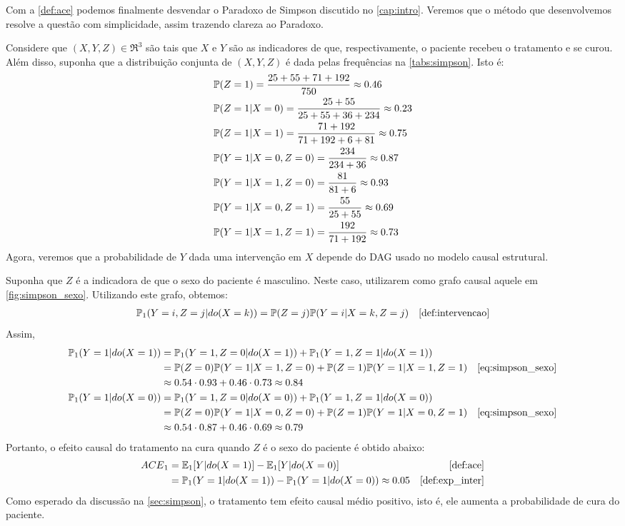 Com a \cref{def:ace} podemos finalmente desvendar
o Paradoxo de Simpson discutido no \cref{cap:intro}.
Veremos que o método que desenvolvemos resolve
a questão com simplicidade,
assim trazendo clareza ao Paradoxo.

\begin{example}
 \label{ex:simpson_fim}
 Considere que $(X,Y,Z) \in \Re^3$ são tais que
 $X$ e $Y$ são as indicadores de que, respectivamente, 
 o paciente recebeu o tratamento e se curou. 
 Além disso, suponha que a distribuição conjunta de $(X,Y,Z)$ é
 dada pelas frequências na \cref{tabs:simpson}. Isto é:
 \begin{align*}
  &\P(Z = 1) = \frac{25+55+71+192}{750} \approx 0.46 \\
  &\P(Z = 1|X = 0) = \frac{25+55}{25+55+36+234} \approx 0.23 \\
  &\P(Z = 1|X = 1) = \frac{71+192}{71+192+6+81} \approx 0.75 \\
  &\P(Y = 1|X = 0, Z = 0) = \frac{234}{234+36} \approx 0.87 \\
  &\P(Y = 1|X = 1, Z = 0) = \frac{81}{81+6} \approx 0.93 \\
  &\P(Y = 1|X = 0, Z = 1) = \frac{55}{25+55} \approx 0.69 \\
  &\P(Y = 1|X = 1, Z = 1) = \frac{192}{71+192} \approx 0.73
 \end{align*}
 Agora, veremos que a probabilidade de $Y$ 
 dada uma intervenção em $X$ depende do DAG usado
 no modelo causal estrutural.
 
 Suponha que $Z$ é a indicadora de que 
 o sexo do paciente é masculino.
 Neste caso, utilizarem como 
 grafo causal aquele em \cref{fig:simpson_sexo}.
 Utilizando este grafo, obtemos:
 \begin{align}
  \label{eq:simpson_sexo}
  \P_1(Y=i,Z=j|do(X=k))
  &= \P(Z=j)\P(Y=i|X=k,Z=j) 
  & \text{\cref{def:intervencao}}
 \end{align}
 Assim,
 \begin{align*}
  \P_1(Y=1|do(X=1))
  &= \P_1(Y=1,Z=0|do(X=1)) + \P_1(Y=1,Z=1|do(X=1)) \\
  &= \P(Z=0)\P(Y=1|X=1,Z=0) + \P(Z=1)\P(Y=1|X=1,Z=1)
  & \text{\cref{eq:simpson_sexo}} \\
  &\approx 0.54 \cdot 0.93 + 0.46 \cdot 0.73 \approx 0.84 \\
  \P_1(Y=1|do(X=0))
  &= \P_1(Y=1,Z=0|do(X=0)) + \P_1(Y=1,Z=1|do(X=0)) \\
  &= \P(Z=0)\P(Y=1|X=0,Z=0) + \P(Z=1)\P(Y=1|X=0,Z=1)
  & \text{\cref{eq:simpson_sexo}} \\
  &\approx 0.54 \cdot 0.87 + 0.46 \cdot 0.69 \approx 0.79 \\
 \end{align*}
 Portanto, o efeito causal do tratamento na cura quando
 $Z$ é o sexo do paciente é obtido abaixo:
 \begin{align*}
  \ACE_1 &= \E_1[Y|do(X=1)] - \E_1[Y|do(X=0)] 
  & \text{\cref{def:ace}} \\
  &= \P_1(Y=1|do(X=1)) - \P_1(Y=1|do(X=0)) \approx 0.05
  & \text{\cref{def:exp_inter}}
 \end{align*}
 Como esperado da discussão na \cref{sec:simpson},
 o tratamento tem efeito causal médio positivo, isto é,
 ele aumenta a probabilidade de cura do paciente.
 

\end{example}
